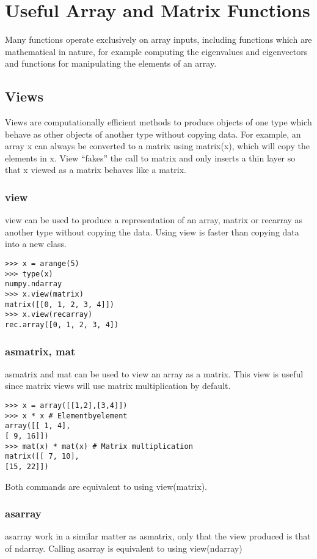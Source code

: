 \documentclass[KSmain.tex]{subfiles}
\begin{document}
 

\section{Useful Array and Matrix Functions}
Many functions operate exclusively on array inputs, including functions which are mathematical in nature,
for example computing the eigenvalues and eigenvectors and functions for manipulating the elements
of an array.

\subsection{Views}
Views are computationally efficient methods to produce objects of one type which behave as other objects
of another type without copying data. For example, an array x can always be converted to a matrix using
matrix(x), which will copy the elements in x. View “fakes” the call to matrix and only inserts a thin layer
so that x viewed as a matrix behaves like a matrix.
\subsubsection{view}
view can be used to produce a representation of an array, matrix or recarray as another type without copying
the data. Using view is faster than copying data into a new class.
\begin{framed}
\begin{verbatim}
>>> x = arange(5)
>>> type(x)
numpy.ndarray
>>> x.view(matrix)
matrix([[0, 1, 2, 3, 4]])
>>> x.view(recarray)
rec.array([0, 1, 2, 3, 4])
\end{verbatim}
\end{framed}
\subsubsection{asmatrix, mat}
asmatrix and mat can be used to view an array as a matrix. This view is useful since matrix views will use
matrix multiplication by default.
\begin{framed}
\begin{verbatim}
>>> x = array([[1,2],[3,4]])
>>> x * x # Elementbyelement
array([[ 1, 4],
[ 9, 16]])
>>> mat(x) * mat(x) # Matrix multiplication
matrix([[ 7, 10],
[15, 22]])
\end{verbatim}
\end{framed}
Both commands are equivalent to using view(matrix).
\subsubsection{asarray}
asarray work in a similar matter as asmatrix, only that the view produced is that of ndarray. Calling
asarray is equivalent to using view(ndarray)
\end{document}
